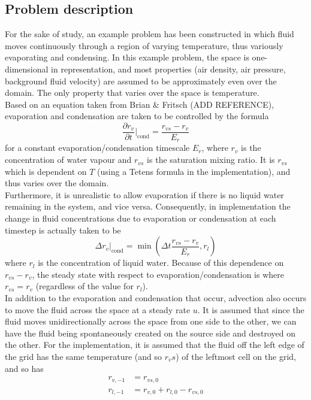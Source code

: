 \documentclass[11pt]{article}
\begin{document}
\subsection{Problem description}
For the sake of study, an example problem has been constructed in which fluid moves continuously through a region of varying temperature, thus variously evaporating and condensing. In this example problem, the space is one-dimensional in representation, and most properties (air density, air pressure, background fluid velocity) are assumed to be approximately even over the domain. The only property that varies over the space is temperature. \\
Based on an equation taken from Brian \& Fritsch (ADD REFERENCE), evaporation and condensation are taken to be controlled by the formula
\begin{equation} \label{eq:1}
\frac{\partial r_v}{\partial t}|_{\text{cond}}=\frac{r_{vs} - r_v}{E_r}
\end{equation}
for a constant evaporation/condensation timescale $E_r$, where $r_v$ is the concentration of water vapour and $r_{vs}$ is the saturation mixing ratio. It is $r_{vs}$ which is dependent on $T$ (using a Tetens formula in the implementation), and thus varies over the domain. \\
Furthermore, it is unrealistic to allow evaporation if there is no liquid water remaining in the system, and vice versa. Consequently, in implementation the change in fluid concentrations due to evaporation or condensation at each timestep is actually taken to be
\begin{equation} \label{eq:2}
\Delta r_v|_{\text{cond}} = \min\left(\Delta t\frac{r_{vs} - r_v}{E_r},r_l\right)
\end{equation}
where $r_l$ is the concentration of liquid water. Because of this dependence on $r_{vs}-r_v$, the steady state with respect to evaporation/condensation is where $r_{vs}=r_v$ (regardless of the value for $r_l$). \\
In addition to the evaporation and condensation that occur, advection also occurs to move the fluid across the space at a steady rate $u$. It is assumed that since the fluid moves unidirectionally across the space from one side to the other, we can have the fluid being spontaneously created on the source side and destroyed on the other. For the implementation, it is assumed that the fluid off the left edge of the grid has the same temperature (and so $r_vs$) of the leftmost cell on the grid, and so has
\begin{align}
r_{v,-1} &= r_{vs,0} \label{eq:a} \\
r_{l,-1} &= r_{v,0}+r_{l,0}-r_{vs,0} \label{eq:b}
\end{align}
\end{document}
